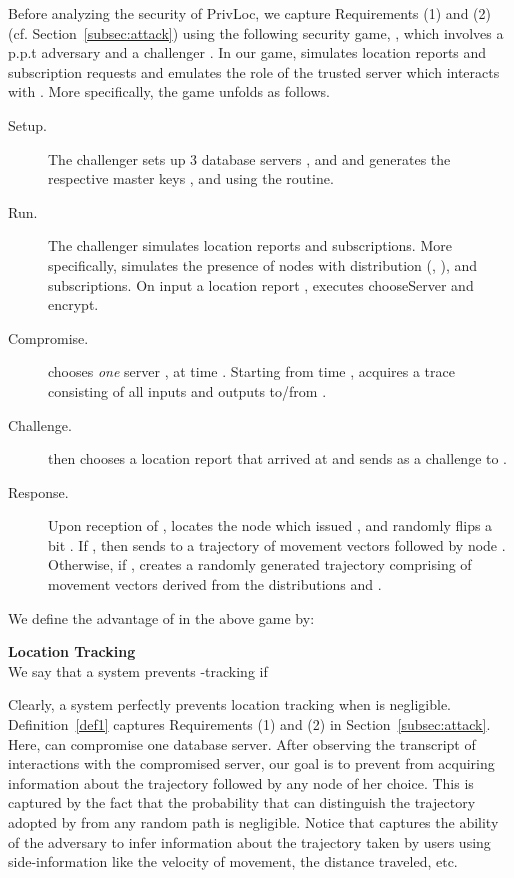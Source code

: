 \documentclass{llncs}
\newcommand\sol{{\sf PrivLoc}}
\begin{document}
Before analyzing the security of \sol, we capture Requirements (1) and (2) (cf. Section~\ref{subsec:attack}) using the following security game, , which involves a p.p.t adversary  and a
challenger . In our game,  simulates location reports and subscription requests and emulates the role of the trusted server  which interacts with . More specifically, the  game unfolds as follows.
\begin{description}
\item [Setup.] The challenger  sets up 3 database servers ,  and  and generates the respective master keys ,  and  using the  routine.
\item [Run.] The challenger  simulates location reports and subscriptions. More specifically,  simulates the presence of  nodes with distribution (, ), and  subscriptions.
On input a location report ,  executes {\sf chooseServer} and {\sf encrypt}.
\item [Compromise.]  chooses \emph{one} server ,  at time .
Starting from time ,  acquires a trace consisting of all inputs and outputs to/from .
\item [Challenge.]  then chooses a location report  that arrived at  and sends  as a challenge to .
\item [Response.] Upon reception of ,  locates the node  which issued , and randomly flips a bit . If , then  sends to  a trajectory of movement vectors followed by node .
Otherwise, if ,  creates a randomly generated trajectory comprising of movement vectors derived from the distributions  and .
\end{description}

We define the advantage of  in the above game  by:


\begin{definition}\label{def1}
\textbf{Location Tracking}\\
We say that a system prevents -tracking if 
\end{definition}

Clearly, a system perfectly prevents location tracking when  is negligible. Definition~\ref{def1} captures Requirements (1) and (2) in Section~\ref{subsec:attack}. Here,  can compromise
one database server. After observing the
transcript of interactions with the compromised server, our goal is to prevent  from acquiring information about the trajectory followed by any node  of her choice.
This is captured by the fact that the probability that  can distinguish the trajectory adopted by  from any random path is negligible. Notice that  captures
the ability of the adversary to infer information about the trajectory taken by users using side-information like the velocity of movement, the distance traveled, etc.
\end{document}
